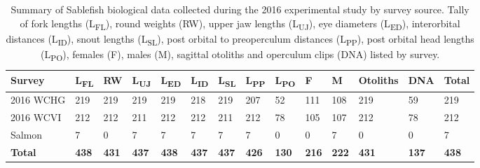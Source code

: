 \documentclass[12pt]{article}\usepackage[]{graphicx}\usepackage[]{color}
\begin{document}
\begin{table}[!h]

\caption{\label{tab:table2}Summary of Sablefish biological data collected during the 2016 experimental study by survey source. Tally of fork lengths (L\textsubscript{FL}), round weights (RW), upper jaw lengths (L\textsubscript{UJ}), eye diameters (L\textsubscript{ED}), interorbital distances (L\textsubscript{ID}), snout lengths (L\textsubscript{SL}), post orbital to preoperculum distances (L\textsubscript{PP}), post orbital head lengths (L\textsubscript{PO}), females (F), males (M), sagittal otoliths and operculum clips (DNA) listed by survey.}
\fontsize{10}{12}\selectfont
\begin{tabular}[t]{llllllllllllll}
\toprule
\textbf{Survey} & \textbf{L\textsubscript{FL}} & \textbf{RW} & \textbf{L\textsubscript{UJ}} & \textbf{L\textsubscript{ED}} & \textbf{L\textsubscript{ID}} & \textbf{L\textsubscript{SL}} & \textbf{L\textsubscript{PP}} & \textbf{L\textsubscript{PO}} & \textbf{F} & \textbf{M} & \textbf{Otoliths} & \textbf{DNA} & \textbf{Total}\\
\midrule
2016 WCHG & 219 & 219 & 219 & 219 & 218 & 219 & 207 & 52 & 111 & 108 & 219 & 59 & 219\\
2016 WCVI & 212 & 212 & 211 & 212 & 212 & 211 & 212 & 78 & 105 & 107 & 212 & 78 & 212\\
Salmon & 7 & 0 & 7 & 7 & 7 & 7 & 7 & 0 & 0 & 7 & 0 & 0 & 7\\
\midrule
\textbf{Total} & \textbf{438} & \textbf{431} & \textbf{437} & \textbf{438} & \textbf{437} & \textbf{437} & \textbf{426} & \textbf{130} & \textbf{216} & \textbf{222} & \textbf{431} & \textbf{137} & \textbf{438}\\
\bottomrule
\end{tabular}
\end{table}
\end{document}
